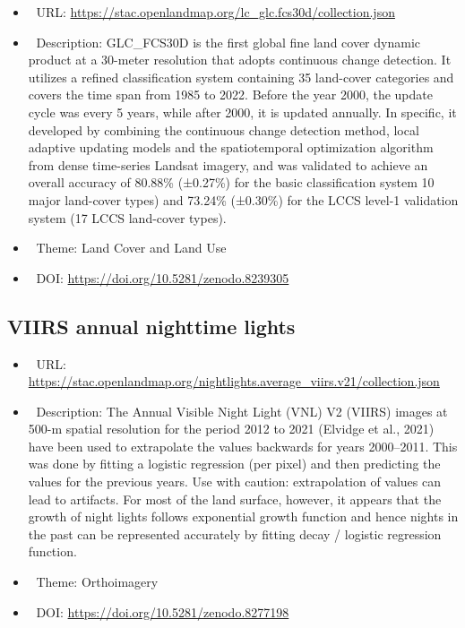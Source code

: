 \documentclass[
  graybox,natbib,nospthms]{svmono}
\providecommand{\tightlist}{%
  \setlength{\itemsep}{0pt}\setlength{\parskip}{0pt}}
\providecommand{\tightlist}{\setlength{\itemsep}{0pt}\setlength{\parskip}{0pt}}
\begin{document}
\begin{itemize}
\tightlist
\item
  🔗 URL: \url{https://stac.openlandmap.org/lc_glc.fcs30d/collection.json}
\item
  📰 Description: GLC\_FCS30D is the first global fine land cover dynamic product at a 30-meter resolution that adopts continuous change detection. It utilizes a refined classification system containing 35 land-cover categories and covers the time span from 1985 to 2022. Before the year 2000, the update cycle was every 5 years, while after 2000, it is updated annually. In specific, it developed by combining the continuous change detection method, local adaptive updating models and the spatiotemporal optimization algorithm from dense time-series Landsat imagery, and was validated to achieve an overall accuracy of 80.88\% (±0.27\%) for the basic classification system 10 major land-cover types) and 73.24\% (±0.30\%) for the LCCS level-1 validation system (17 LCCS land-cover types).
\item
  📝 Theme: Land Cover and Land Use
\item
  📂 DOI: \url{https://doi.org/10.5281/zenodo.8239305}
\end{itemize}

\hypertarget{viirs-annual-nighttime-lights}{%
\subsection{VIIRS annual nighttime lights}\label{viirs-annual-nighttime-lights}}

\begin{itemize}
\tightlist
\item
  🔗 URL: \url{https://stac.openlandmap.org/nightlights.average_viirs.v21/collection.json}
\item
  📰 Description: The Annual Visible Night Light (VNL) V2 (VIIRS) images at 500-m spatial resolution for the period 2012 to 2021 (Elvidge et al., 2021) have been used to extrapolate the values backwards for years 2000--2011. This was done by fitting a logistic regression (per pixel) and then predicting the values for the previous years. Use with caution: extrapolation of values can lead to artifacts. For most of the land surface, however, it appears that the growth of night lights follows exponential growth function and hence nights in the past can be represented accurately by fitting decay / logistic regression function.
\item
  📝 Theme: Orthoimagery
\item
  📂 DOI: \url{https://doi.org/10.5281/zenodo.8277198}
\end{itemize}
\end{document}
